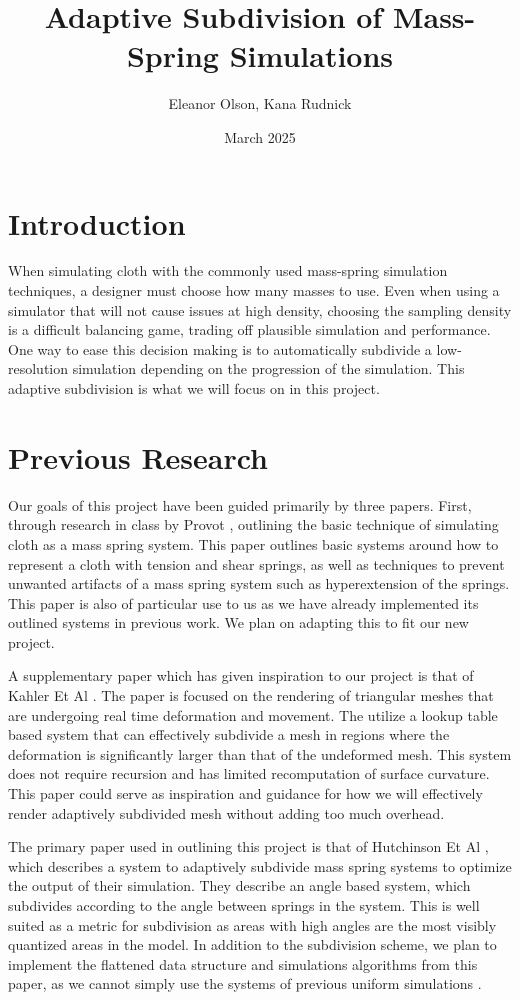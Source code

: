 \documentclass{article}
\title{Adaptive Subdivision of Mass-Spring Simulations}
\author{Eleanor Olson, Kana Rudnick}
\date{March 2025}
\begin{document}
\maketitle
\begin{multicols}{2}
\section*{Introduction}
When simulating cloth with the commonly used mass-spring simulation techniques, a designer must choose how many masses to use. Even when using a simulator that will not cause issues at high density, choosing the sampling density is a difficult balancing game, trading off plausible simulation and performance. One way to ease this decision making is to automatically subdivide a low-resolution simulation depending on the progression of the simulation. This adaptive subdivision is what we will focus on in this project.
\section*{Previous Research}
Our goals of this project have been guided primarily by three papers. First, through research in class by Provot \cite{provot}, outlining the basic technique of simulating cloth as a mass spring system. This paper outlines basic systems around how to represent a cloth with tension and shear springs, as well as techniques to prevent unwanted artifacts of a mass spring system such as hyperextension of the springs. This paper is also of particular use to us as we have already implemented its outlined systems in previous work. We plan on adapting this to fit our new project.
\medskip

A supplementary paper which has given inspiration to our project is that of Kahler Et Al \cite{kahler}. The paper is focused on the rendering of triangular meshes that are undergoing real time deformation and movement. The utilize a lookup table based system that can effectively subdivide a mesh in regions where the deformation is significantly larger than that of the undeformed mesh. This system does not require recursion and has limited recomputation of surface curvature. This paper could serve as inspiration and guidance for how we will effectively render adaptively subdivided mesh without adding too much overhead.
\medskip

The primary paper used in outlining this project is that of Hutchinson Et Al \cite{hutchinson}, which describes a system to adaptively subdivide mass spring systems to optimize the output of their simulation. They describe an angle based system, which subdivides according to the angle between springs in the system. This is well suited as a metric for subdivision as areas with high angles are the most visibly quantized areas in the model. In addition to the subdivision scheme, we plan to implement the flattened data structure and simulations algorithms from this paper, as we cannot simply use the systems of previous uniform simulations \cite{provot}.

\end{multicols}
\end{document}
